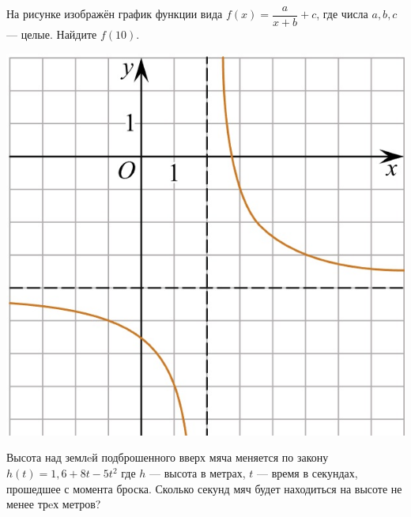 \begin{class}[number=4]
\begin{listofex}
\begin{minipage}[c]{0.25\textwidth}
		\end{minipage}
		\item
		\begin{minipage}[t]{0.67\textwidth}
			На рисунке изображён график функции вида \(f(x)=\dfrac{a}{x+b}+c\), где числа \(a, b, c\) --- целые. Найдите \(f(10)\).
		\end{minipage}
		\begin{minipage}[c]{0.25\textwidth}
			\includegraphics[align=t, width=\textwidth]{pics/G101M4C4-9.jpg}
		\end{minipage}
		\item Высота над землeй подброшенного вверх мяча меняется по закону \(h(t)=1,6+8t-5t^2\) где \(h\) --- высота в метрах, \(t\) --- время в секундах, прошедшее с момента броска. Сколько секунд мяч будет
		находиться на высоте не менее трeх метров?
	\end{listofex}
\end{class}
%
%
%
%
